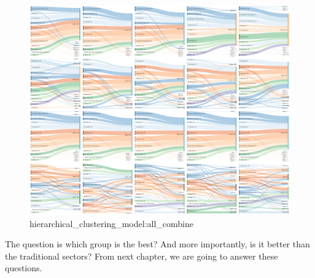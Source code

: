 \documentclass[../main.tex]{subfiles}
\begin{document}
\begin{figure}[H]
    \centering
    \includegraphics[scale=0.25]{images/all_combine.png}
    \caption{hierarchical_clustering_model:all_combine}
    \label{fig:fig:hierarchical_clustering_model:all_combine}
\end{figure}

The question is which group is the best? And more importantly, is it better than the traditional sectors? From next chapter, we are going to answer these questions.
\end{document}
